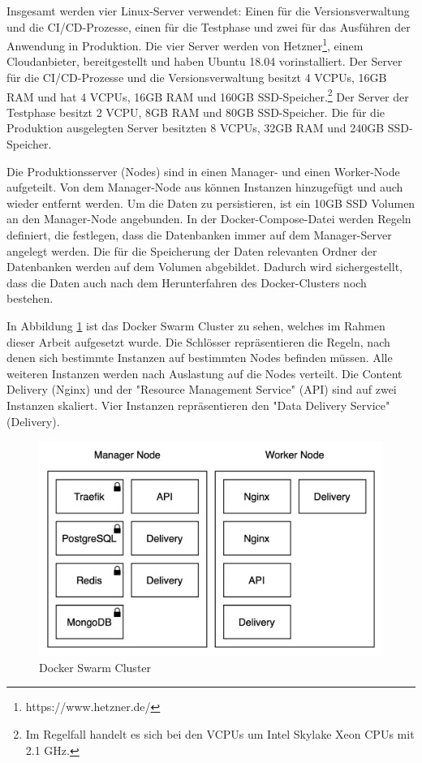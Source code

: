 Insgesamt werden vier Linux-Server verwendet: Einen für die Versionsverwaltung
und die CI/CD-Prozesse, einen für die Testphase und zwei für das Ausführen der Anwendung in Produktion.
Die vier Server werden von Hetzner\footnote{https://www.hetzner.de/}, einem Cloudanbieter, bereitgestellt und haben Ubuntu 18.04
vorinstalliert. Der Server für die CI/CD-Prozesse und die Versionsverwaltung besitzt 4 VCPUs, 
16GB RAM und  hat 4 VCPUs, 16GB RAM und 160GB SSD-Speicher.\footnote{Im Regelfall handelt es sich bei
den VCPUs um Intel Skylake Xeon CPUs mit 2.1 GHz.\cite{CPUusedInHetznerCLoud}}
Der Server der Testphase besitzt 2 VCPU, 8GB RAM und 80GB SSD-Speicher. Die für die Produktion
ausgelegten Server besitzten 8 VCPUs, 32GB RAM und 240GB SSD-Speicher.


Die Produktionsserver (Nodes) sind in einen Manager- und einen Worker-Node aufgeteilt. Von dem Manager-Node
aus können Instanzen hinzugefügt und auch wieder entfernt werden. Um die Daten zu persistieren,
ist ein 10GB SSD Volumen an den Manager-Node angebunden. In der Docker-Compose-Datei werden
Regeln definiert, die festlegen, dass die Datenbanken immer auf dem Manager-Server angelegt werden.
Die für die Speicherung der Daten relevanten Ordner der Datenbanken werden auf dem Volumen abgebildet.
Dadurch wird sichergestellt, dass die Daten auch nach dem Herunterfahren des Docker-Clusters noch bestehen.

In Abbildung \ref{figure:dockerswarmcluster} ist das Docker Swarm Cluster zu sehen, welches im Rahmen
dieser Arbeit aufgesetzt wurde. Die Schlösser repräsentieren die Regeln, nach denen sich
bestimmte Instanzen auf bestimmten Nodes befinden müssen. Alle weiteren Instanzen
werden nach Auslastung auf die Nodes verteilt. Die Content Delivery (Nginx)
und der "Resource Management Service" (API) sind auf zwei Instanzen skaliert. Vier Instanzen repräsentieren
den "Data Delivery Service" (Delivery).

\begin{figure}
    \begin{center}
    \includegraphics[scale=0.2]{img/abbildungen/Cluster}
    \end{center}
    \caption{Docker Swarm Cluster}
    \label{figure:dockerswarmcluster}
\end{figure}


